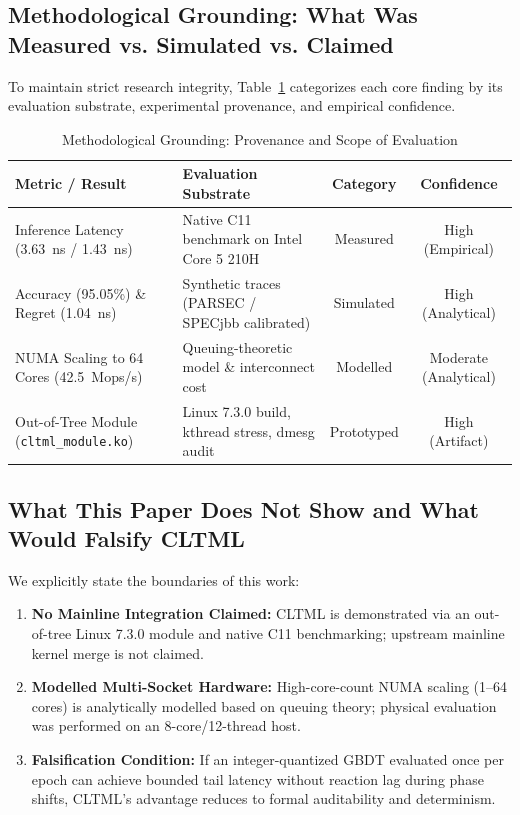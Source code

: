 \documentclass[conference]{IEEEtran}
\begin{document}
\subsection{Methodological Grounding: What Was Measured vs. Simulated vs. Claimed}
To maintain strict research integrity, Table~\ref{tab:grounding} categorizes each core finding by its evaluation substrate, experimental provenance, and empirical confidence.

\begin{table}[t]
\centering
\caption{Methodological Grounding: Provenance and Scope of Evaluation}
\label{tab:grounding}
\begin{tabular}{p{2.3cm}p{2.2cm}cc}
\toprule
\textbf{Metric / Result} & \textbf{Evaluation Substrate} & \textbf{Category} & \textbf{Confidence} \\
\midrule
Inference Latency (3.63~ns / 1.43~ns) & Native C11 benchmark on Intel Core 5 210H & Measured & High (Empirical) \\
Accuracy (95.05\%) \& Regret (1.04~ns) & Synthetic traces (PARSEC / SPECjbb calibrated) & Simulated & High (Analytical) \\
NUMA Scaling to 64 Cores (42.5~Mops/s) & Queuing-theoretic model \& interconnect cost & Modelled & Moderate (Analytical) \\
Out-of-Tree Module (\texttt{cltml\_module.ko}) & Linux 7.3.0 build, kthread stress, dmesg audit & Prototyped & High (Artifact) \\
\bottomrule
\end{tabular}
\end{table}

\subsection{What This Paper Does Not Show and What Would Falsify CLTML}
We explicitly state the boundaries of this work:
\begin{enumerate}
    \item \textbf{No Mainline Integration Claimed:} CLTML is demonstrated via an out-of-tree Linux 7.3.0 module and native C11 benchmarking; upstream mainline kernel merge is not claimed.
    \item \textbf{Modelled Multi-Socket Hardware:} High-core-count NUMA scaling (1--64 cores) is analytically modelled based on queuing theory; physical evaluation was performed on an 8-core/12-thread host.
    \item \textbf{Falsification Condition:} If an integer-quantized GBDT evaluated once per epoch can achieve bounded tail latency without reaction lag during phase shifts, CLTML's advantage reduces to formal auditability and determinism.
\end{enumerate}
\end{document}
